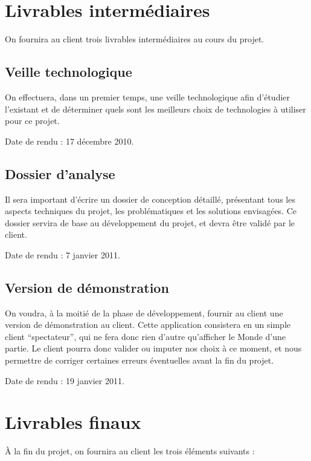 \documentclass[a4paper,10pt]{report}
\begin{document}
  \chapter{Livrables intermédiaires}

    On fournira au client trois livrables intermédiaires au cours du projet. 

    \section{Veille technologique}

      On effectuera, dans un premier temps, une veille technologique afin d'étudier l'existant et de déterminer quels sont les meilleurs choix de technologies à utiliser pour ce projet. 

      Date de rendu : 17 décembre 2010.

    \section{Dossier d'analyse}

      Il sera important d'écrire un dossier de conception détaillé, présentant tous les aspects techniques du projet, les problématiques et les solutions envisagées. Ce dossier servira de base au développement du projet, et devra être validé par le client. 

      Date de rendu : 7 janvier 2011.

    \section{Version de démonstration}

      On voudra, à la moitié de la phase de développement, fournir au client une version de démonstration au client. Cette application consistera en un simple client ``spectateur'', qui ne fera donc rien d'autre qu'afficher le Monde d'une partie. Le client pourra donc valider ou imputer nos choix à ce moment, et nous permettre de corriger certaines erreurs éventuelles avant la fin du projet. 

      Date de rendu : 19 janvier 2011. 



  \chapter{Livrables finaux}

    À la fin du projet, on fournira au client les trois éléments suivants : 
\end{document}
